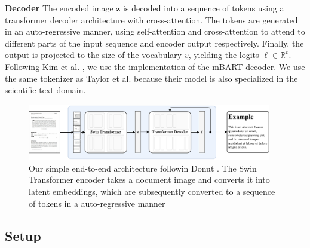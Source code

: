 \documentclass[]{article}
\newcommand{\para}[1]{\textbf{#1} \quad}
\begin{document}
\para{Decoder}
The encoded image $\mathbf z$ is decoded into a sequence of tokens using a transformer decoder architecture with cross-attention.  %
The tokens are generated in an auto-regressive manner, using self-attention and cross-attention to attend to different parts of the input sequence and encoder output respectively. Finally, the output is projected to the size of the vocabulary $v$, yielding the logits $\boldsymbol\ell \in \mathbb R^v$.\\
Following Kim et al. \cite{kim_ocr-free_2022}, we use the implementation of the mBART \cite{lewis_bart_2019} decoder. We use the same tokenizer as Taylor et al. \cite{taylor_galactica_2022} because their model is also specialized in the scientific text domain.
\begin{figure}
    \centering
    \includegraphics[width=0.95\textwidth]{figures/model.pdf}
    \caption{
    Our simple end-to-end architecture followin Donut \cite{kim_ocr-free_2022}. The Swin Transformer encoder takes a document image and converts it into latent embeddings, which are subsequently converted to a sequence of tokens in a auto-regressive manner}
    \label{fig:model}
\end{figure}

\subsection{Setup}
\end{document}
